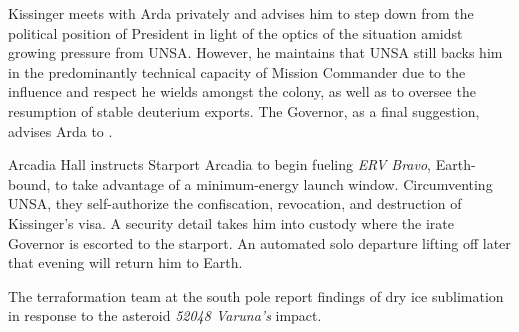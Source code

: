 Kissinger meets with Arda privately and advises him to step down from the political position of President in light of the optics of the situation amidst growing pressure from UNSA. However, he maintains that UNSA still backs him in the predominantly technical capacity of Mission Commander due to the influence and respect he wields amongst the colony, as well as to oversee the resumption of stable deuterium exports. The Governor, as a final suggestion, advises Arda to .
\StopTimelineDate

Arcadia Hall instructs Starport Arcadia to begin fueling {\it ERV Bravo}, Earth-bound, to take advantage of a minimum-energy launch window. Circumventing UNSA, they self-authorize the confiscation, revocation, and destruction of Kissinger's visa. A security detail takes him into custody where the irate Governor is escorted to the starport. An automated solo departure lifting off later that evening will return him to Earth.
\StopTimelineDate

The terraformation team at the south pole report findings of dry ice sublimation in response to the asteroid {\it 52048 Varuna's} impact.
\StopTimelineDate

